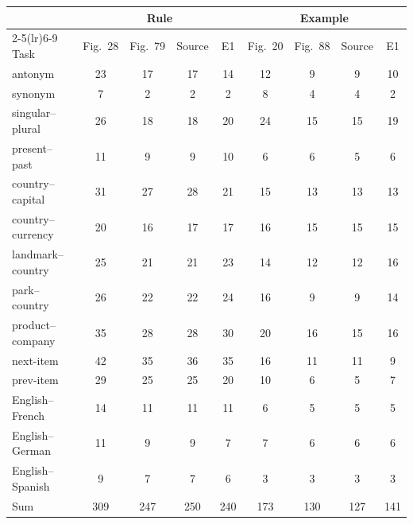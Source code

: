 \begin{tabular}{@{}lcccccccc@{}}
\toprule
 & \multicolumn{4}{c}{Rule} & \multicolumn{4}{c}{Example} \\
\cmidrule(lr){2-5}\cmidrule(lr){6-9}
Task & Fig.~28 & Fig.~79 & Source & E1 & Fig.~20 & Fig.~88 & Source & E1 \\
\midrule
antonym & 23 & 17 & 17 & 14 & 12 & 9 & 9 & 10 \\
synonym & 7 & 2 & 2 & 2 & 8 & 4 & 4 & 2 \\
singular--plural & 26 & 18 & 18 & 20 & 24 & 15 & 15 & 19 \\
present--past & 11 & 9 & 9 & 10 & 6 & 6 & 5 & 6 \\
country--capital & 31 & 27 & 28 & 21 & 15 & 13 & 13 & 13 \\
country--currency & 20 & 16 & 17 & 17 & 16 & 15 & 15 & 15 \\
landmark--country & 25 & 21 & 21 & 23 & 14 & 12 & 12 & 16 \\
park--country & 26 & 22 & 22 & 24 & 16 & 9 & 9 & 14 \\
product--company & 35 & 28 & 28 & 30 & 20 & 16 & 15 & 16 \\
next-item & 42 & 35 & 36 & 35 & 16 & 11 & 11 & 9 \\
prev-item & 29 & 25 & 25 & 20 & 10 & 6 & 5 & 7 \\
English--French & 14 & 11 & 11 & 11 & 6 & 5 & 5 & 5 \\
English--German & 11 & 9 & 9 & 7 & 7 & 6 & 6 & 6 \\
English--Spanish & 9 & 7 & 7 & 6 & 3 & 3 & 3 & 3 \\
\midrule
Sum & 309 & 247 & 250 & 240 & 173 & 130 & 127 & 141 \\
\bottomrule
\end{tabular}

